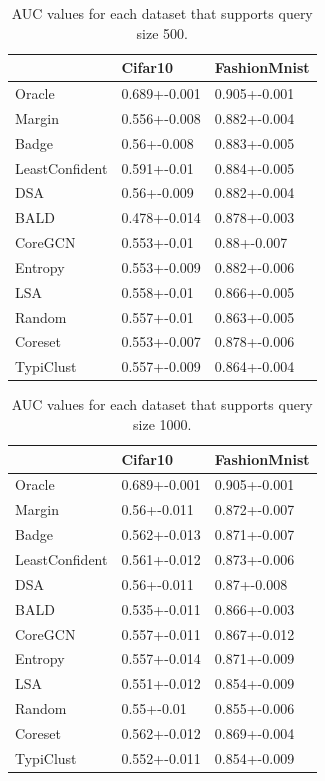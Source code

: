 \documentclass[]{article}
\begin{document}
\begin{minipage}{0.47\linewidth}
	\begin{table}[H]
		\caption{AUC values for each dataset that supports query size 500.}
		\begin{tabular}{l|ll}
			& Cifar10 & FashionMnist \\
			\hline
			Oracle & 0.689+-0.001 & 0.905+-0.001 \\
			Margin & 0.556+-0.008 & 0.882+-0.004 \\
			Badge & 0.56+-0.008 & 0.883+-0.005 \\
			LeastConfident & 0.591+-0.01 & 0.884+-0.005 \\
			DSA & 0.56+-0.009 & 0.882+-0.004 \\
			BALD & 0.478+-0.014 & 0.878+-0.003 \\
			CoreGCN & 0.553+-0.01 & 0.88+-0.007 \\
			Entropy & 0.553+-0.009 & 0.882+-0.006 \\
			LSA & 0.558+-0.01 & 0.866+-0.005 \\
			Random & 0.557+-0.01 & 0.863+-0.005 \\
			Coreset & 0.553+-0.007 & 0.878+-0.006 \\
			TypiClust & 0.557+-0.009 & 0.864+-0.004
		\end{tabular}
	\end{table}
\end{minipage}
\hspace{10mm}
\begin{minipage}{0.47\linewidth}
	\begin{table}[H]
		\caption{AUC values for each dataset that supports query size 1000.}
		\begin{tabular}{l|ll}
			& Cifar10 & FashionMnist \\
			\hline
			Oracle & 0.689+-0.001 & 0.905+-0.001 \\
			Margin & 0.56+-0.011 & 0.872+-0.007 \\
			Badge & 0.562+-0.013 & 0.871+-0.007 \\
			LeastConfident & 0.561+-0.012 & 0.873+-0.006 \\
			DSA & 0.56+-0.011 & 0.87+-0.008 \\
			BALD & 0.535+-0.011 & 0.866+-0.003 \\
			CoreGCN & 0.557+-0.011 & 0.867+-0.012 \\
			Entropy & 0.557+-0.014 & 0.871+-0.009 \\
			LSA & 0.551+-0.012 & 0.854+-0.009 \\
			Random & 0.55+-0.01 & 0.855+-0.006 \\
			Coreset & 0.562+-0.012 & 0.869+-0.004 \\
			TypiClust & 0.552+-0.011 & 0.854+-0.009
		\end{tabular}
	\end{table}
\end{minipage}
\end{document}

